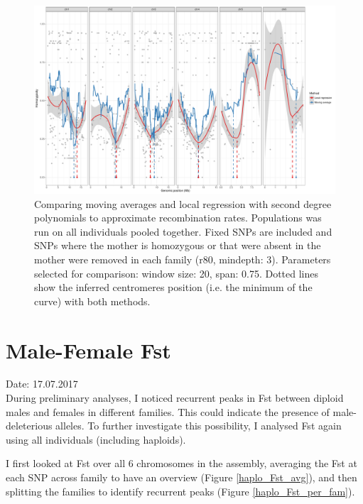 \documentclass[10pt,a4paper]{report}
\begin{document}
\begin{figure}[h]
	\begin{center}
		\includegraphics[width=1.1\textwidth]{Num_CSD_loci/centro_group_fix_d3r80_final.pdf}
		\caption{Comparing moving averages and local regression with second degree polynomials to approximate recombination rates. Populations was run on all individuals pooled together. Fixed SNPs are included and SNPs where the mother is homozygous or that were absent in the mother were removed in each family (r80, mindepth: 3). Parameters selected for comparison: window size: 20, span: 0.75. Dotted lines show the inferred centromeres position (i.e. the minimum of the curve) with both methods.}
		\label{centro_fix}
	\end{center}
\end{figure}
\FloatBarrier

\chapter{Male-Female Fst}

Date: 17.07.2017\\
During preliminary analyses, I noticed recurrent peaks in Fst between diploid males and females in different families. This could indicate the presence of male-deleterious alleles. To further investigate this possibility, I analysed Fst again using all individuals (including haploids).

I first looked at Fst over all 6 chromosomes in the assembly, averaging the Fst at each SNP across family to have an overview (Figure \ref{haplo_Fst_avg}), and then splitting the families to identify recurrent peaks (Figure \ref{haplo_Fst_per_fam}).
\end{document}
